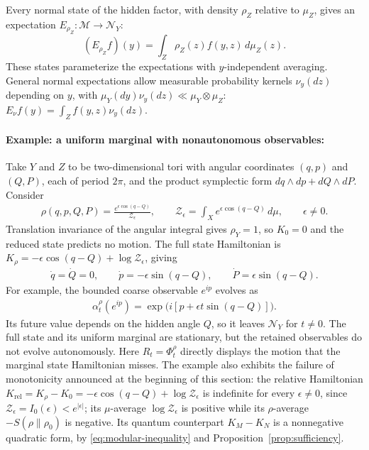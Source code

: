 \documentclass[a4paper,11pt]{article}
\theoremstyle{definition}
\begin{document}
Every normal state of the hidden factor, with density $\rho_Z$ relative to $\mu_Z$,
gives an expectation $E_{\rho_Z}:\mathcal M\to\mathcal N_Y$:
\begin{equation}
 (E_{\rho_Z}f)(y)=\int_Z\rho_Z(z)f(y,z)\,d\mu_Z(z).
\end{equation}
These states parameterize the expectations with $y$-independent averaging.
General normal expectations allow measurable probability kernels $\nu_y(dz)$
depending on $y$, with $\mu_Y(dy)\nu_y(dz)\ll\mu_Y\otimes\mu_Z$:
$E_\nu f(y)=\int_Z f(y,z)\nu_y(dz)$.

\paragraph{Example: a uniform marginal with nonautonomous observables:}
Take $Y$ and $Z$ to be two-dimensional tori with angular coordinates $(q,p)$ and $(Q,P)$, each of period $2\pi$, and the product symplectic form $dq\wedge dp+dQ\wedge dP$. Consider
\begin{align}
    \rho(q,p,Q,P)=\frac{e^{\epsilon\cos(q-Q)}}{\mathcal Z_\epsilon},
    \qquad
    \mathcal Z_\epsilon=\int_X e^{\epsilon\cos(q-Q)}\,d\mu,
    \qquad \epsilon\ne0.
\end{align}
Translation invariance of the angular integral gives $\rho_Y=1$, so $K_0=0$ and the reduced state predicts no motion. The full state Hamiltonian is $K_\rho=-\epsilon\cos(q-Q)+\log\mathcal Z_\epsilon$, giving
\begin{align}
    \dot q=\dot Q=0,\qquad
    \dot p=-\epsilon\sin(q-Q),\qquad
    \dot P=\epsilon\sin(q-Q).
\end{align}
For example, the bounded coarse observable $e^{ip}$ evolves as
\begin{align}
    \alpha_t^\rho(e^{ip})
    =\exp\bigl(i[p+\epsilon t\sin(q-Q)]\bigr).
\end{align}
Its future value depends on the hidden angle $Q$, so it leaves $\mathcal N_Y$ for $t\ne0$. The full state and its uniform marginal are stationary, but the retained observables do not evolve autonomously. Here $R_t=\Phi_t^\rho$ directly displays the motion that the marginal state Hamiltonian misses. The example also exhibits the failure of monotonicity announced at the beginning of this section: the relative Hamiltonian $K_{\mathrm{rel}}=K_\rho-K_0=-\epsilon\cos(q-Q)+\log\mathcal Z_\epsilon$ is indefinite for every $\epsilon\ne0$, since $\mathcal Z_\epsilon=I_0(\epsilon)<e^{|\epsilon|}$; its $\mu$-average $\log\mathcal Z_\epsilon$ is positive while its $\rho$-average $-S(\rho\|\rho_0)$ is negative. Its quantum counterpart $K_M-K_N$ is a nonnegative quadratic form, by \eqref{eq:modular-inequality} and Proposition~\ref{prop:sufficiency}.
\end{document}
